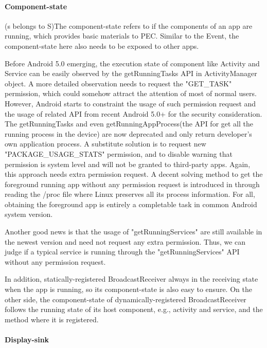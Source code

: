 \documentclass{sig-alternate-05-2015}
\begin{document}
\paragraph{Component-state}

(s belongs to S)The component-state refers to if the components of an app are running, which provides basic materials to PEC. Similar to the Event, the component-state here also needs to be exposed to other apps.

Before {\color{red}Android 5.0} emerging, the execution state of component like Activity and Service can be easily observed by the {\color{red}getRunningTasks API in ActivityManager object}. A more detailed observation needs to request the "GET\_TASK" permission, which could somehow attract the attention of most of normal users. However, Android starts to constraint the usage of such permission request and the usage of related API from recent {\color{red}Android 5.0+} for the security consideration. The getRunningTasks and even getRunningAppProcess(the API for get all the running process in the device) are now deprecated and only return developer's own application process. {\color{red}A substitute solution is to request new "PACKAGE\_USAGE\_STATS" permission, and to disable warning that permission is system level and will not be granted to third-party apps. Again, this approach needs extra permission request. } A decent solving method to get the foreground running app without any permission request is introduced in  \cite{getforeground} through reading the /proc file where Linux preserves all its process information. For all, obtaining the foreground app is entirely a completable task in common Android system version. 

Another good news is that the usage of  "getRunningServices" are still available in the newest version and need not request any extra permission. Thus, we can judge if a typical service is running through the "getRunningServices" API without any permission request. 

In addition, statically-registered BroadcastReceiver always in the receiving state when the app is running, so its component-state is also easy to ensure. On the other side, the component-state of dynamically-registered BroadcastReceiver follows the running state of its host component, e.g., activity and service, and the method where it is registered.


\paragraph{Display-sink}
\end{document}
